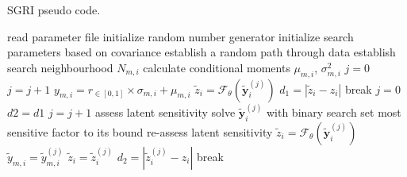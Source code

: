 \begin{algorithm}
    \caption{SGRI pseudo code.}\label{alg:sgri}
    \begin{algorithmic}[1]
        \State read parameter file
        \State initialize random number generator
        \State initialize search parameters based on covariance
         
        \State establish a random path through data
         
         
        \State establish search neighbourhood $N_{m,i}$
        \State calculate conditional moments $\mu_{m,i}$, $\sigma_{m,i}^{2}$
        \EndFor {}
        \State $j = 0$
         
        \State $j = j + 1$
        \State $y_{m, i} = r_{\in[0,1]} \times \sigma_{m,i} + \mu_{m,i}$ 
        \EndFor
        \State $\tilde{z}_{i} = \mathcal{F}_{\theta}(\tilde{\mathbf{y}}_{i}^{{(j)}})$
        \State $d_{1} = |\tilde{z}_{i} - z_{i}|$ 
        \State break
        \EndIf
        \EndWhile {}
        \State $j = 0$
        \State $d2 = d1$
         
        \State $j = j + 1$
        \State assess latent sensitivity
        \State solve $\tilde{\mathbf{y}}_{i}^{(j)}$ with binary search
        \Else
        \State set most sensitive factor to its bound
        \State re-assess latent sensitivity
        \EndIf
        \State $\tilde{z}_{i} = \mathcal{F}_{\theta}(\tilde{\mathbf{y}}_{i}^{(j)})$
         
        \State $\tilde{y}_{m,i} = \tilde{y}_{m,i}^{(j)}$ 
        \State $\tilde{z}_{i} =\tilde{z}_{i}^{(j)}$ 
        \State $d_{2} = |\tilde{z}_{i}^{(j)} - z_{i}|$ 
        \EndIf
        \State break
        \EndIf
        \EndWhile {}
        \EndFor {}
        \EndFor {}
    \end{algorithmic}
\end{algorithm}


\FloatBarrier

